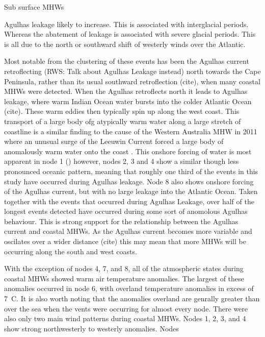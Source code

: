 \documentclass[a4paper,10pt,review]{elsarticle}
\begin{document}
\citet{Schaeffer2017} Sub surface MHWs

\citet{Beal2011} Agulhas leakage likely to increase. This is associated with interglacial periods. Whereas the abatement of leakage is associated with severe glacial periods. This is all due to the north or southward shift of westerly winds over the Atlantic.

Most notable from the clustering of these events has been the Agulhas current retroflecting (RWS: Talk about Agulhas Leakage instead) north towards the Cape Peninsula, rather than its usual southward retroflection (cite), when many coastal MHWs were detected. When the Agulhas retroflects north it leads to Agulhas leakage, where warm Indian Ocean water bursts into the colder Atlantic Ocean (cite). These warm eddies then typically spin up along the west coast. This transport of a large body ofg atypically warm water along a large stretch of coastline is a similar finding to the cause of the Western Australia MHW in 2011 where an unusual surge of the Leeuwin Current forced a large body of anomalously warm water onto the coast \citep{Feng2013, Benthuysen2014}. This onshore forcing of water is most apparent in node 1 () however, nodes 2, 3 and 4 show a similar though less pronounced oceanic pattern, meaning that roughly one third of the events in this study have occurred during Agulhas leakage. Node 8 also shows onshore forcing of the Agulhas current, but with no large leakage into the Atlantic Ocean. Taken together with the events that occurred during Agulhas Leakage, over half of the longest events detected have occurred during some sort of anomolous Agulhas behaviour. This is strong support for the relationship between the Agulhas current and coastal MHWs. As the Agulhas current becomes more variable and oscilates over a wider distance (cite) this may mean that more MHWs will be occurring along the south and west coasts.

With the exception of nodes 4, 7, and 8, all of the atmospheric states during coastal MHWs showed warm air temperature anomalies. The largest of these anomalies occurred in node 6, with overland temperature anomalies in excess of 7\degree\ C. It is also worth noting that the anomalies overland are genrally greater than over the sea when the vents were occurring for almost every node. There were also only two main wind patterns during coastal MHWs. Nodes 1, 2, 3, and 4 show strong northwesterly to westerly anomalies. Nodes 
\end{document}
